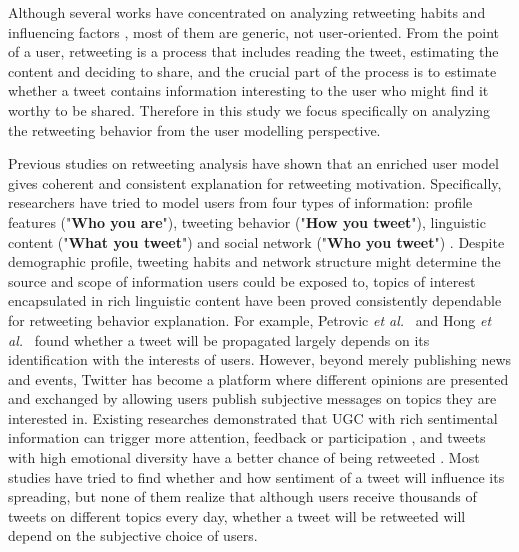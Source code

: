 \documentclass[twocolumn]{svjour3}          %
\begin{document}
Although several works have concentrated on analyzing retweeting habits and influencing factors \cite{boyd2010tweet,kwak2010twitter,Suh2010}, most of them are generic, not user-oriented.
From the point of a user, retweeting is a process that includes reading the tweet, estimating the content and deciding to share, and the crucial part of the process is to estimate whether a tweet contains information interesting to the user who might find it worthy to be shared.
Therefore in this study we focus specifically on analyzing the retweeting behavior from the user modelling perspective.

Previous studies on retweeting analysis have shown that an enriched user model gives coherent and consistent explanation for retweeting motivation\cite{Abel:2011AUM,conf/icwsm/MacskassyM11,conf/wsdm/FengW13}. 
Specifically, researchers have tried to model users from four types of information:
profile features ("\textbf{Who you are}"), tweeting behavior ("\textbf{How you tweet}"), linguistic content ("\textbf{What you tweet}") and social network ("\textbf{Who you tweet}") \cite{Pennacchiotti:icwsm11}. 
Despite demographic profile, tweeting habits and network structure might determine the source and scope of information users could be exposed to, topics of interest encapsulated in rich linguistic content have been proved consistently dependable for retweeting behavior explanation. 
For example, Petrovic \emph{et al.}~\cite{Osborne_Lavrenko_2011} and Hong \emph{et al.}~\cite{ericmedvet:hong2011} found whether a tweet will be propagated largely depends on its identification with the interests of users. 
However, beyond merely publishing news and events, Twitter has become a platform where different opinions are presented and exchanged by allowing users publish subjective messages on topics they are interested in. 
Existing researches demonstrated that UGC with rich sentimental information can trigger more attention, feedback or participation \cite{DBLP:conf/hicss/StieglitzD12}, and tweets with high emotional diversity have a better chance of being retweeted \cite{conf/icwsm/PfitznerGS12}.
Most studies have tried to find whether and how sentiment of a tweet will influence its spreading, but none of them realize that although users receive thousands of tweets on different topics every day, whether a tweet will be retweeted will depend on the subjective choice of users. 
\end{document}
